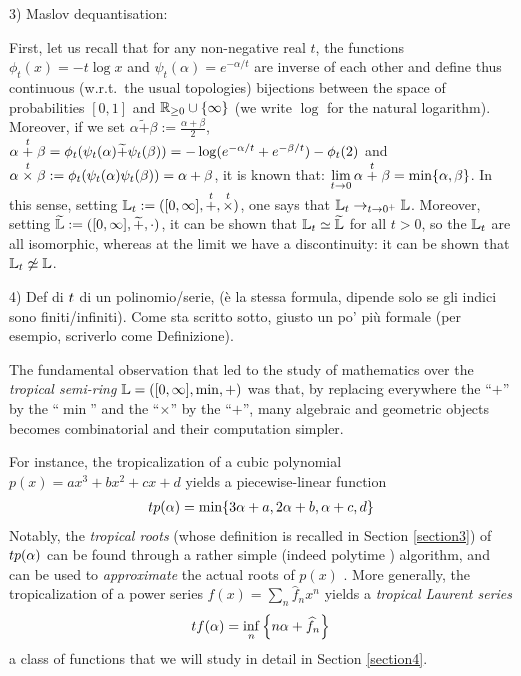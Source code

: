 3) Maslov dequantisation:

First, let us recall that for any non-negative real $t$, the functions $\phi_{t}(x)=-t\log x$ and $\psi_{t}(\alpha)=e^{-\alpha/t}$ are inverse of each other and define thus continuous (w.r.t.\ the usual topologies) bijections between the space of probabilities $[0,1]$ and $\mathbb{R}_{\geq 0}\cup\{\infty\}$ (we write $\log$ for the natural logarithm).
Moreover, if we set $\alpha \widetilde+ \beta:= \frac{\alpha+\beta}{2}$, $\alpha\stackrel{t}{+}\beta=\phi_{t}(\psi_{t}(\alpha)\widetilde{+}\psi_{t}(\beta))=-\log (e^{-\alpha/t}+e^{-\beta/t})-\phi_{t}(2)$ and $\alpha\stackrel{t}{\times} \beta:=\phi_{t}(\psi_{t}(\alpha)\psi_{t}(\beta))=\alpha+\beta$, it is known that: $\lim\limits_{t\to 0}\alpha\stackrel{t}{+} \beta= \min\{\alpha,\beta\}$.
In this sense, setting $\mathbb{L}_t:=([0,\infty],\stackrel{t}{+},\stackrel{t}{\times})$, one says that $\mathbb{L}_t\to_{t\to 0^+}\mathbb{L}$.
Moreover, setting $\widetilde{\mathbb{L}}:=([0,\infty],\widetilde+,\cdot)$, it can be shown that $\mathbb{L}_t\simeq\widetilde{\mathbb{L}}$ for all $t>0$, so the $\mathbb{L}_t$ are all isomorphic, whereas at the limit we have a discontinuity: it can be shown that $\mathbb{L}_t\not\simeq\mathbb{L}$.

4) Def di $\trop$ di un polinomio/serie, (\`e la stessa formula, dipende solo se gli indici sono finiti/infiniti).
Come sta scritto sotto, giusto un po' pi\`u formale (per esempio, scriverlo come Definizione).

The fundamental observation that led to the study of mathematics over the \emph{tropical semi-ring} $\mathbb{L}=([0,\infty],\min,+)$ was that, by replacing everywhere the ``$+$'' by the ``$\min$'' and the ``$\times$'' by the ``$+$'', many algebraic and geometric objects becomes combinatorial and their computation simpler. 

For instance, the tropicalization of a cubic polynomial $p(x)=ax^{3}+bx^{2}+cx+d$ yields a piecewise-linear function 
\begin{align}
\trop p(\alpha)= \min\{ 3\alpha+a, 2\alpha+b, \alpha+c,d\}
\end{align}
Notably, the \emph{tropical roots} (whose definition is recalled in Section \ref{section3}) of $\trop p(\alpha)$ can be found through a rather simple (indeed polytime \cite{}) algorithm, and can be used to \emph{approximate} the actual roots of $p(x)$ \cite{}. 
More generally, the tropicalization of a power series $f(x)=\sum_{n}\widehat f_{n}x^{n}$ yields a \emph{tropical Laurent series} \cite{} 
\begin{align}
\trop f(\alpha)= \inf_{n}\left\{n\alpha+ \widehat f_{n}\right\}
\end{align}
a class of functions that we will study in detail in Section \ref{section4}.


